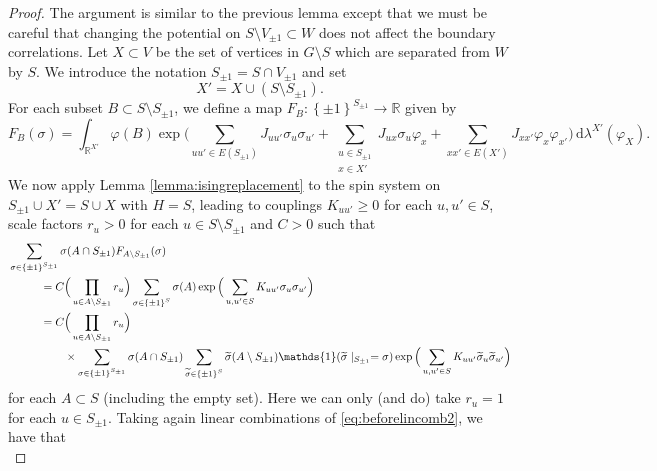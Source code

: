 \documentclass{article}
\numberwithin{equation}{section}
\theoremstyle{definition}
\theoremstyle{definition}
\theoremstyle{remark}
\renewcommand{\d}{\mathrm{d}}
\newcommand{\id}{\mathds{1}}
\newcommand\vp{\varphi}
\newcommand\R{\mathbb{R}}
\renewcommand{\d}{\mathrm{d}}
\renewcommand{\l}{\lambda}
\newcommand{\Vis}{V_{\mathrm{Ising}}}
\renewcommand{\Vis}{V_{\pm 1}}
\newcommand{\Sis}{S_{\pm 1}}
\begin{document}
\begin{proof}	
	The argument is similar to the previous lemma except that we must be careful that changing the potential on $S \setminus \Vis \subset W$ does not affect the boundary correlations. 
	Let $X \subset V$ be the set of vertices in $G \setminus S$ which are separated from $W$ by $S$. We introduce the notation $\Sis = S \cap \Vis$ and set
	\[
	X' = X \cup (S \setminus \Sis).
	\] 
	For each subset $B \subset S \setminus \Sis$, we define a map $F_B : \left\{ \pm 1 \right\}^{\Sis} \to \R$ given by
	\begin{equation}\label{eq:Fmap2}
		F_B(\sigma) = \int_{\R^{X'}} \vp(B) \exp\Big(\sum_{uu' \in E(\Sis)} J_{uu'} \sigma_u \sigma_{u'} + \sum_{\substack{u \in \Sis \\ x \in X'}} J_{ux} \sigma_u \vp_x +\sum_{xx' \in E(X')} J_{xx'} \vp_x \vp_{x'}\Big) \, \d\l^{X'}(\vp_X).
	\end{equation}
	We now apply Lemma \ref{lemma:isingreplacement} to the spin system on $\Sis \cup X' = S \cup X$ with $H = S$, leading to couplings $ K_{uu'} \geq 0$ for each $u,u' \in S$, scale factors $r_u > 0$ for each $u \in S \setminus \Sis$ and $C > 0$ such that
	\begin{equation}\label{eq:beforelincomb2}
		\begin{split}
		&\sum_{\sigma \in \left\{ \pm 1 \right\}^{\Sis}} \sigma(A \cap \Sis) F_{A \setminus \Sis}(\sigma) \\
		&\hspace{1cm}= C  \Big( \prod_{u \in A \setminus \Sis} r_u \Big)  \sum_{\sigma \in \left\{ \pm 1 \right\}^S} \sigma(A) \exp\Big (\sum_{u,u' \in S} K_{uu'} \sigma_u \sigma_{u'}\Big)  \\
		&\hspace{1cm}= C \Big( \prod_{u \in A \setminus \Sis} r_u \Big) \\
		&\hspace{1.75cm}\times\sum_{\sigma \in \left\{ \pm 1 \right\}^{\Sis}} \sigma(A \cap \Sis) \sum_{\widetilde{\sigma} \in \left\{ \pm 1 \right\}^S} \widetilde{\sigma}(A \setminus \Sis) \id(\widetilde{\sigma}\mid_{\Sis} = \sigma) \exp\Big (\sum_{u,u' \in S} K_{uu'} \widetilde{\sigma}_u \widetilde{\sigma}_{u'}\Big)
		\end{split}
	\end{equation} 
	for each $A \subset S$ (including the empty set). Here we can only (and do) take $r_u = 1$ for each $u \in \Sis$. 
	Taking again linear combinations of \eqref{eq:beforelincomb2}, we have that 
	\begin{equation}\label{eq:afterlincomb2}

\end{equation}
\end{proof}
\end{document}

